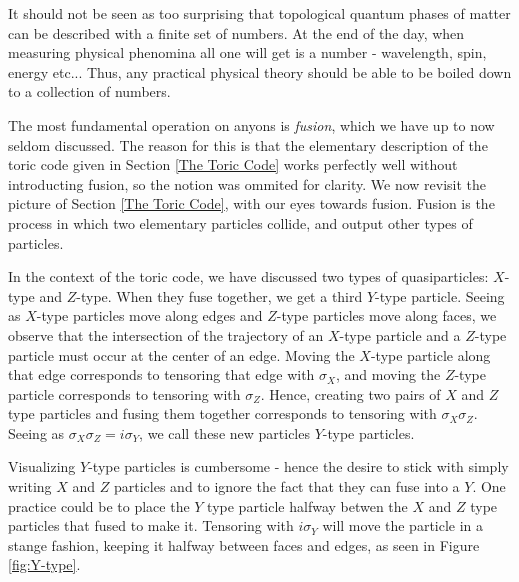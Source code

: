 \documentclass{article}
\theoremstyle{definition}
\numberwithin{figure}{section}
\begin{document}
It should not be seen as too surprising that topological quantum phases of matter can be described with a finite set of numbers. At the end of the day, when measuring physical phenomina all one will get is a number - wavelength, spin, energy etc... Thus, any practical physical theory should be able to be boiled down to a collection of numbers.

The most fundamental operation on anyons is \textit{fusion}, which we have up to now seldom discussed. The reason for this is that the elementary description of the toric code given in Section \ref{The Toric Code} works perfectly well without introducting fusion, so the notion was ommited for clarity. We now revisit the picture of Section \ref{The Toric Code}, with our eyes towards fusion. Fusion is the process in which two elementary particles collide, and output other types of particles. 

In the context of the toric code, we have discussed two types of quasiparticles: $X$-type and $Z$-type. When they fuse together, we get a third $Y$-type particle. Seeing as $X$-type particles move along edges and $Z$-type particles move along faces, we observe that the intersection of the trajectory of an $X$-type particle and a $Z$-type particle must occur at the center of an edge. Moving the $X$-type particle along that edge corresponds to tensoring that edge with $\sigma_{X}$, and moving the $Z$-type particle corresponds to tensoring with $\sigma_{Z}$. Hence, creating two pairs of $X$ and $Z$ type particles and fusing them together corresponds to tensoring with $\sigma_X\sigma_Z$. Seeing as $\sigma_X\sigma_Z=i\sigma_Y$, we call these new particles $Y$-type particles.

Visualizing $Y$-type particles is cumbersome - hence the desire to stick with simply writing $X$ and $Z$ particles and to ignore the fact that they can fuse into a $Y$. One practice could be to place the $Y$ type particle halfway betwen the $X$ and $Z$ type particles that fused to make it. Tensoring with $i\sigma_Y$ will move the particle in a stange fashion, keeping it halfway between faces and edges, as seen in Figure \ref{fig:Y-type}.
\end{document}
